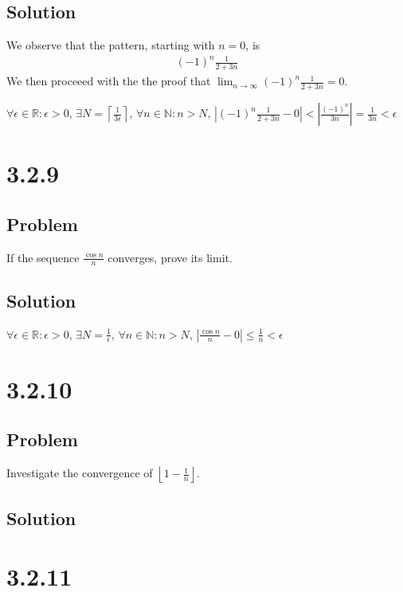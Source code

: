 \documentclass[12pt]{article}
\newcommand{\abs}  [1]{\left|       #1 \right|      }
\newcommand{\floor}[1]{\left\lfloor #1 \right\rfloor}
\newcommand{\ceil} [1]{\left\lceil  #1 \right\rceil }
\newcommand{\R}    [0]{\mathbb{R}                   }
\newcommand{\N}    [0]{\mathbb{N}                   }
\begin{document}
\subsection*{Solution}
We observe that the pattern, starting with $n = 0$, is
\begin{align*}
    (-1)^n \frac{1}{2 + 3n}
\end{align*}
We then proceeed with the the proof that $\lim_{n \to \infty} (-1)^n \frac{1}{2 + 3n} = 0$.

$\forall \epsilon \in \R : \epsilon > 0$, $\exists N = \ceil{\frac{1}{3 \epsilon}}$, $\forall n \in \N : n > N$, $\abs{(-1)^n \frac{1}{2 + 3n} - 0} < \abs{\frac{(-1)^n}{3n}} = \frac{1}{3n} < \epsilon$



\section*{3.2.9}

\subsection*{Problem}
If the sequence $\frac{\cos n}{n}$ converges, prove its limit.

\subsection*{Solution}
$\forall \epsilon \in \R : \epsilon > 0$, $\exists N = \frac{1}{\epsilon}$, $\forall n \in \N : n > N$, $\abs{\frac{\cos n}{n} - 0} \leq \frac{1}{n} < \epsilon$



\section*{3.2.10}

\subsection*{Problem}
Investigate the convergence of $\floor{1 - \frac{1}{n}}$.

\subsection*{Solution}



\section*{3.2.11}
\end{document}
